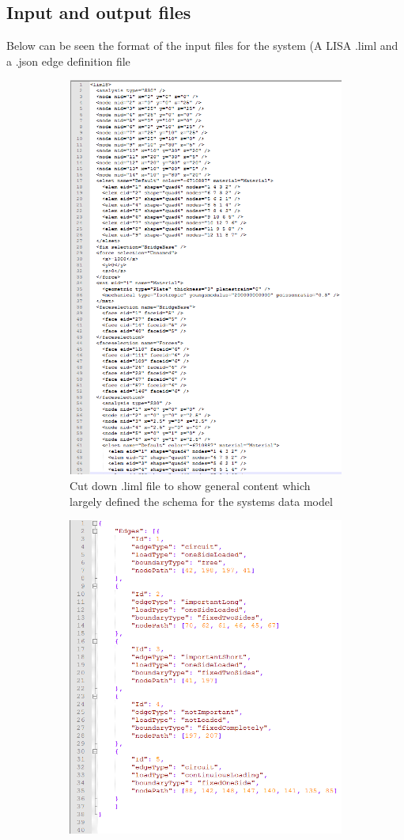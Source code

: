 \begin{changemargin}{\CMwidth}{\CMheight}
\section{Input and output files}
Below can be seen the format of the input files for the system (A LISA .liml and a .json edge definition file


\begin{figure}[!h]
\centering
\begin{subfigure}{.5\textwidth}
  \centering
  \includegraphics[width=0.6\linewidth]{../Graphics/limlFileLayout.png}
  \caption{Cut down .liml file to show general content which largely defined the schema for the systems data model}
  \label{fig:sub1}
\end{subfigure}%
\begin{subfigure}{.5\textwidth}
  \centering
  \includegraphics[width=0.8\linewidth]{../Graphics/jsonEdgeFileLayout.png}

\end{subfigure}
\end{figure}
\end{changemargin}

